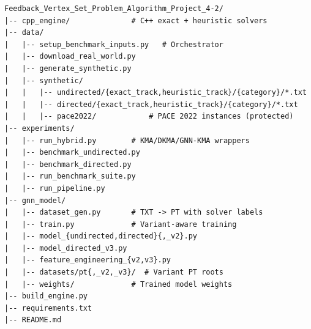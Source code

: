 \documentclass[10pt,a4paper]{report}
\theoremstyle{definition}
\begin{document}
\begin{lstlisting}[caption=Repository directory layout]
Feedback_Vertex_Set_Problem_Algorithm_Project_4-2/
|-- cpp_engine/              # C++ exact + heuristic solvers
|-- data/
|   |-- setup_benchmark_inputs.py   # Orchestrator
|   |-- download_real_world.py
|   |-- generate_synthetic.py
|   |-- synthetic/
|   |   |-- undirected/{exact_track,heuristic_track}/{category}/*.txt
|   |   |-- directed/{exact_track,heuristic_track}/{category}/*.txt
|   |   |-- pace2022/            # PACE 2022 instances (protected)
|-- experiments/
|   |-- run_hybrid.py        # KMA/DKMA/GNN-KMA wrappers
|   |-- benchmark_undirected.py
|   |-- benchmark_directed.py
|   |-- run_benchmark_suite.py
|   |-- run_pipeline.py
|-- gnn_model/
|   |-- dataset_gen.py       # TXT -> PT with solver labels
|   |-- train.py             # Variant-aware training
|   |-- model_{undirected,directed}{,_v2}.py
|   |-- model_directed_v3.py
|   |-- feature_engineering_{v2,v3}.py
|   |-- datasets/pt{,_v2,_v3}/  # Variant PT roots
|   |-- weights/             # Trained model weights
|-- build_engine.py
|-- requirements.txt
|-- README.md
\end{lstlisting}
\end{document}
